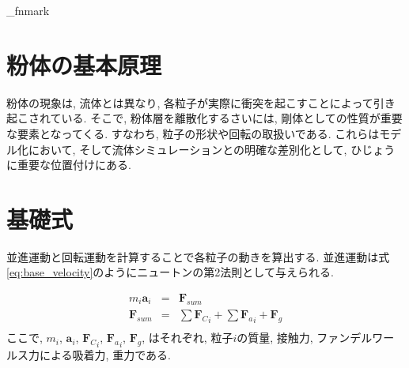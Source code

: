 \documentclass[a4paper, 10pt]{jarticle} %
\begin{document}
%
%
%
\init_fnmark %



\section{粉体の基本原理}
粉体の現象は, 流体とは異なり, 各粒子が実際に衝突を起こすことによって引き起こされている.
そこで, 粉体層を離散化するさいには, 剛体としての性質が重要な要素となってくる.
すなわち, 粒子の形状や回転の取扱いである.
これらはモデル化において, そして流体シミュレーションとの明確な差別化として, ひじょうに重要な位置付けにある.


 \section{基礎式}
  並進運動と回転運動を計算することで各粒子の動きを算出する.
  並進運動は式\eqref{eq:base_velocity}のようにニュートンの第2法則として与えられる.

  \begin{eqnarray}
   \label{eq:base_velocity}
   m_{i}{\boldsymbol a}_i &=& {\boldsymbol F}_{sum}\\
   {\boldsymbol F}_{sum} &=& \sum {{\boldsymbol F}_ C }_i + \sum {{\boldsymbol F}_ a }_i + {\boldsymbol F}_{g}\\
  \end{eqnarray}
  ここで, $m_i$, ${\boldsymbol a}_i$, ${{\boldsymbol F}_C}_i$, ${{\boldsymbol F}_a}_i$, ${\boldsymbol F}_g$, はそれぞれ, 粒子$i$の質量, 接触力, ファンデルワールス力による吸着力, 重力である.
\end{document}
